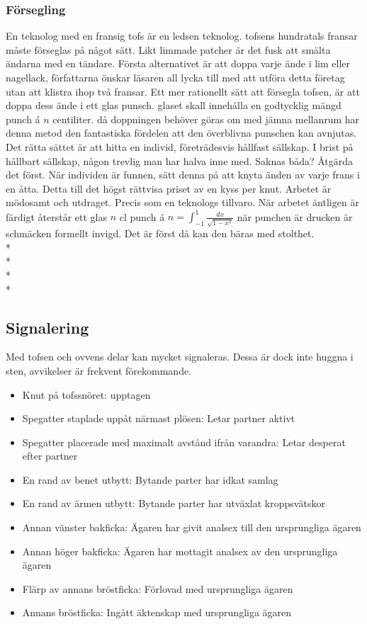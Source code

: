 \subsubsection*{\textbf{Försegling}}
En teknolog med en fransig tofs är en ledsen teknolog. tofsens hundratals fransar måste förseglas på något sätt. Likt limmade patcher är det fusk att smälta
ändarna med en tändare. Första alternativet är att doppa varje ände i lim eller nagellack, författarna önskar läsaren all lycka till med att utföra detta
företag utan att klistra ihop två fransar. Ett mer rationellt sätt att försegla tofsen, är att doppa dess ände i ett glas punsch. glaset skall innehålla 
en godtycklig mängd punch á $n$ centiliter. då doppningen behöver göras om med jämna mellanrum har denna metod den fantastiska fördelen att den överblivna 
punschen kan avnjutas. Det rätta sättet är att hitta en individ, företrädesvis hållfast sällskap. I brist på hållbart sällskap, någon trevlig man har halva inne med.
Saknas båda? Åtgärda det först. När individen är funnen, sätt denna på att knyta änden av varje frans i en åtta. Detta till det högst rättvisa priset av en kyss per knut.
Arbetet är mödosamt och utdraget. Precis som en teknologs tillvaro. När arbetet äntligen är färdigt återstår ett glas $n$ cl punch á $n =\int_{-1}^{1} \frac{dx}{\sqrt{1-x^2}}$
när punchen är drucken är schmäcken formellt invigd. Det är först då kan den bäras med stolthet.\\*\\*
\\*
\\*


\subsection*{\textbf{Signalering}}
Med tofsen och ovvens delar kan mycket signaleras. Dessa är dock inte huggna i sten, avvikelser är frekvent förekommande.
\begin{itemize}
    \item Knut på tofssnöret: upptagen
    \item Spegatter staplade uppåt närmast plösen: Letar partner aktivt
    \item Spegatter placerade med maximalt avstånd ifrån varandra: Letar desperat efter partner
    \item En rand av benet utbytt: Bytande parter har idkat samlag
    \item En rand av ärmen utbytt: Bytande parter har utväxlat kroppsvätskor
    \item Annan vänster bakficka: Ägaren har givit analsex till den ursprungliga ägaren
    \item Annan höger bakficka: Ägaren har mottagit analsex av den ursprungliga ägaren
    \item Flärp av annans bröstficka: Förlovad med ursprungliga ägaren
    \item Annans bröstficka: Ingått äktenskap med ursprungliga ägaren
\end{itemize}

\newpage